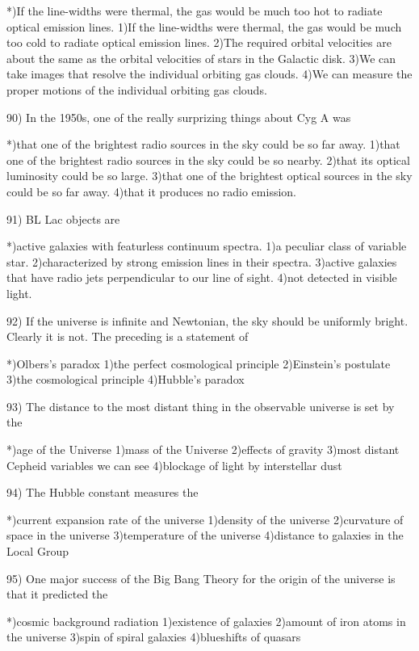  *)If the line-widths were thermal, the gas would be much too hot to
   radiate optical emission lines.
 1)If the line-widths were thermal, the gas would be much too cold to
   radiate optical emission lines.
 2)The required orbital velocities are about the same as the orbital
   velocities of stars in the Galactic disk.
 3)We can take images that resolve the individual orbiting gas clouds.
 4)We can measure the proper motions of the individual orbiting gas clouds.
 
90) In the 1950s, one of the really surprizing things about Cyg A was
 
 *)that one of the brightest radio sources in the sky could be so far away.
 1)that one of the brightest radio sources in the sky could be so nearby.
 2)that its optical luminosity could be so large.
 3)that one of the brightest optical sources in the sky could be so far 
   away.
 4)that it produces no radio emission.
 
91) BL Lac objects are
 
 *)active galaxies with featurless continuum spectra.
 1)a peculiar class of variable star.
 2)characterized by strong emission lines in their spectra.
 3)active galaxies that have radio jets perpendicular to our line of sight.
 4)not detected in visible light.
 
92) If the universe is infinite and Newtonian, the sky should be uniformly
    bright.  Clearly it is not.  The preceding is a statement of
 
 *)Olbers's paradox
 1)the perfect cosmological principle
 2)Einstein's postulate
 3)the cosmological principle
 4)Hubble's paradox
 
93) The distance to the most distant thing in the observable universe is
    set by the
 
 *)age of the Universe
 1)mass of the Universe
 2)effects of gravity
 3)most distant Cepheid variables we can see
 4)blockage of light by interstellar dust
 
94) The Hubble constant measures the
 
 *)current expansion rate of the universe
 1)density of the universe
 2)curvature of space in the universe
 3)temperature of the universe
 4)distance to galaxies in the Local Group
 
95) One major success of the Big Bang Theory for the origin of the
    universe is that it predicted the
 
 *)cosmic background radiation
 1)existence of galaxies
 2)amount of iron atoms in the universe
 3)spin of spiral galaxies
 4)blueshifts of quasars
 
